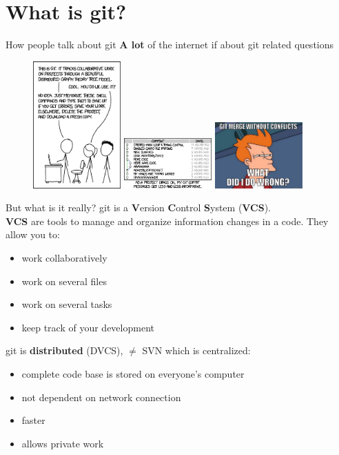 \documentclass[compress,english,aspectratio=1610]{beamer}
\let\olditem\item
\renewcommand{\item}{\setlength{\itemsep}{\fill}\olditem}
\begin{document}
\section{What is git?}
\begin{frame}{How people talk about git}
	\textbf{A lot} of the internet if about git related questions
	\begin{figure}
     	\includegraphics[width=0.3\textwidth]{figures/xkcd1.png}
     	\includegraphics[width=0.3\textwidth]{figures/xkcd2.png}
     	\includegraphics[width=0.3\textwidth]{figures/futurama.jpg}
     \end{figure}
\end{frame}


\begin{frame}{But what is it really?}
	git is a \textbf{V}ersion \textbf{C}ontrol \textbf{S}ystem (\textbf{VCS}).\\
	\textbf{VCS} are tools to manage and organize information changes in a code. They allow you to:
	\begin{itemize}
		\item work collaboratively
		\item work on several files
		\item work on several tasks
		\item keep track of your development
	\end{itemize}
	git is \textbf{distributed} (DVCS), $\neq$ SVN which is centralized:
	\begin{itemize}
		\item complete code base is stored on everyone's computer
		\item not dependent on network connection
		\item faster
		\item allows private work
	\end{itemize}
\end{frame}
\end{document}
